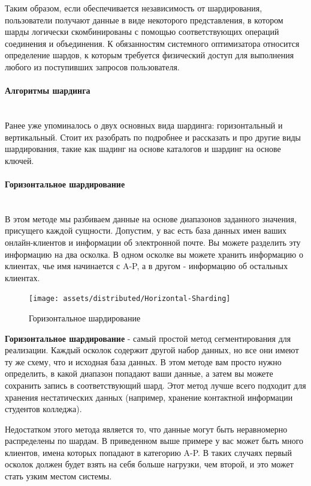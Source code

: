 Таким образом, если обеспечивается независимость от шардирования, пользователи получают данные в виде некоторого
представления, в котором шарды логически скомбинированы с помощью соответствующих операций соединения и объединения.
К обязанностям системного оптимизатора относится определение шардов, к которым требуется физический доступ для
выполнения любого из поступивших запросов пользователя. \autocite{IntroBD2014}

\paragraph{Алгоритмы шардинга} ~\\
Ранее уже упоминалось о двух основных вида шардинга: горизонтальный и вертикальный. Стоит их разобрать по подробнее и
рассказать и про другие виды шардирования, такие как шадинг на основе каталогов и шардинг на основе ключей.

\paragraph{Горизонтальное шардирование} ~\\
В этом методе мы разбиваем данные на основе диапазонов заданного значения, присущего каждой сущности. Допустим, у вас
есть база данных имен ваших онлайн-клиентов и информации об электронной почте. Вы можете разделить эту информацию на
два осколка. В одном осколке вы можете хранить информацию о клиентах, чье имя начинается с A-P, а в другом - информацию
об остальных клиентах.

\begin{figure}[H]
    \centering
    \texttt{[image: assets/distributed/Horizontal-Sharding]}
    \caption{Горизонтальное шардирование}
    \label{fig:Horizontal-Sharding}
\end{figure}

\textbf{Горизонтальное шардирование} - самый простой метод сегментирования для реализации. Каждый осколок содержит
другой набор данных, но все они имеют ту же схему, что и исходная база данных. В этом методе вам просто нужно
определить, в какой диапазон попадают ваши данные, а затем вы можете сохранить запись в соответствующий шард. Этот
метод лучше всего подходит для хранения нестатических данных (например, хранение контактной информации студентов
колледжа).

Недостатком этого метода является то, что данные могут быть неравномерно распределены по шардам. В приведенном выше
примере у вас может быть много клиентов, имена которых попадают в категорию A-P. В таких случаях первый осколок должен
будет взять на себя больше нагрузки, чем второй, и это может стать узким местом системы. \autocite{DatabaseSharding}


